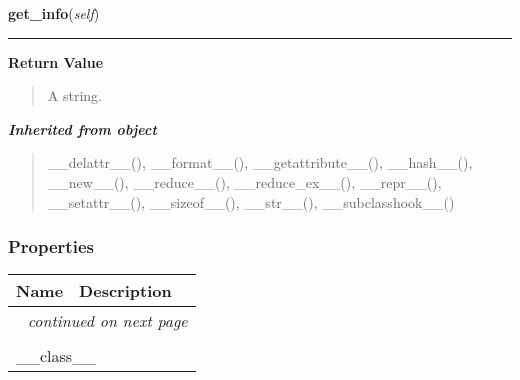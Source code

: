     \label{trunk:qstkutil:DataAccess:DataAccess:get_info}

    \vspace{0.5ex}

\hspace{.8\funcindent}\begin{boxedminipage}{\funcwidth}

    \raggedright \textbf{get\_info}(\textit{self})

    \vspace{-1.5ex}

    \rule{\textwidth}{0.5\fboxrule}
\setlength{\parskip}{2ex}
\setlength{\parskip}{1ex}
      \textbf{Return Value}
    \vspace{-1ex}

      \begin{quote}
      A string.

      \end{quote}

    \end{boxedminipage}


\large{\textbf{\textit{Inherited from object}}}

\begin{quote}
\_\_delattr\_\_(), \_\_format\_\_(), \_\_getattribute\_\_(), \_\_hash\_\_(), \_\_new\_\_(), \_\_reduce\_\_(), \_\_reduce\_ex\_\_(), \_\_repr\_\_(), \_\_setattr\_\_(), \_\_sizeof\_\_(), \_\_str\_\_(), \_\_subclasshook\_\_()
\end{quote}


  \subsubsection{Properties}

    \vspace{-1cm}
\hspace{\varindent}\begin{longtable}{|p{\varnamewidth}|p{\vardescrwidth}|l}
\cline{1-2}
\cline{1-2} \centering \textbf{Name} & \centering \textbf{Description}& \\
\cline{1-2}
\endhead\cline{1-2}\multicolumn{3}{r}{\small\textit{continued on next page}}\\\endfoot\cline{1-2}
\endlastfoot\multicolumn{2}{|l|}{\textit{Inherited from object}}\\
\multicolumn{2}{|p{\varwidth}|}{\raggedright \_\_class\_\_}\\
\cline{1-2}
\end{longtable}

